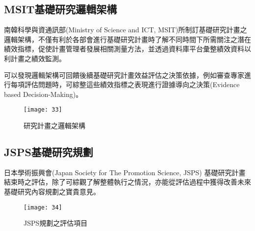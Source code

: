 \subsection{MSIT基礎研究邏輯架構}
\par
\renewcommand{\baselinestretch}{1} %
\twelve 南韓科學與資通訊部(Ministry of Science and ICT, MSIT)所制訂基礎研究計畫之邏輯架構，不僅有利於各部會進行基礎研究計畫時了解不同時間下所需關注之潛在績效指標，促使計畫管理者發展相關測量方法，並透過資料庫平台彙整績效資料以利計畫之績效監測。
\\
\par
\renewcommand{\baselinestretch}{1} %
\twelve 可以發現邏輯架構可回饋後續基礎研究計畫效益評估之決策依據，例如審查專家進行每項評估問題時，可綜整這些績效指標之表現進行證據導向之決策(Evidence based Decision-Making)。
\par
\begin{figure}[hbt!]
\begin{center}
\texttt{[image: 33]}
\caption{\large 研究計畫之邏輯架構}\label{fig.研究計畫之邏輯架構}
\end{center}
\end{figure}
\par

\renewcommand{\baselinestretch}{20} %
\subsection{JSPS基礎研究規劃}
\par
\renewcommand{\baselinestretch}{1} %
\twelve  日本學術振興會(Japan Society for The Promotion Science, JSPS) 基礎研究計畫結束時之評估，除了可綜觀了解整體執行之情況，亦能從評估過程中獲得改善未來基礎研究內容規劃之寶貴意見。
\par
\begin{figure}[hbt!]
\begin{center}
\texttt{[image: 34]}
\caption{\large JSPS規劃之評估項目}\label{fig.JSPS規劃之評估項目}
\end{center}
\end{figure}
\par
\renewcommand{\baselinestretch}{20} %
